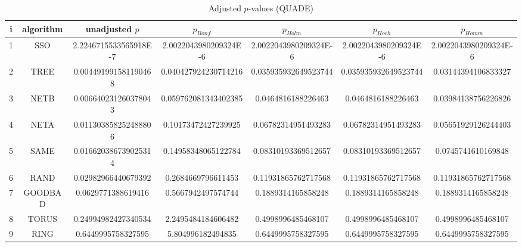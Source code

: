 \documentclass[a4paper,10pt]{article}
\begin{document}
\begin{landscape}
\begin{table}[!htp]
\centering\scriptsize
\caption{Adjusted $p$-values (QUADE)}
\begin{tabular}{ccccccc}
i&algorithm&unadjusted $p$&$p_{Bonf}$&$p_{Holm}$&$p_{Hoch}$&$p_{Homm}$\\
\hline
1& SSO&2.2246715533565918E-7&2.0022043980209324E-6&2.0022043980209324E-6&2.0022043980209324E-6&2.0022043980209324E-6\\
2& TREE&0.004491991581190468&0.040427924230714216&0.035935932649523744&0.035935932649523744&0.03144394106833327\\
3& NETB&0.006640231260378043&0.059762081343402385&0.0464816188226463&0.0464816188226463&0.03984138756226826\\
4& NETA&0.011303858252488806&0.10173472427239925&0.06782314951493283&0.06782314951493283&0.05651929126244403\\
5& SAME&0.016620386739025314&0.14958348065122784&0.08310193369512657&0.08310193369512657&0.0745741610169848\\
6& RAND&0.02982966440679392&0.2684669796611453&0.11931865762717568&0.11931865762717568&0.11931865762717568\\
7& GOODBAD&0.0629771388619416&0.5667942497574744&0.1889314165858248&0.1889314165858248&0.1889314165858248\\
8& TORUS&0.24994982427340534&2.2495484184606482&0.4998996485468107&0.4998996485468107&0.4998996485468107\\
9& RING&0.6449995758327595&5.804996182494835&0.6449995758327595&0.6449995758327595&0.6449995758327595\\
\hline
\end{tabular}
\end{table}


\end{landscape}
\end{document}
